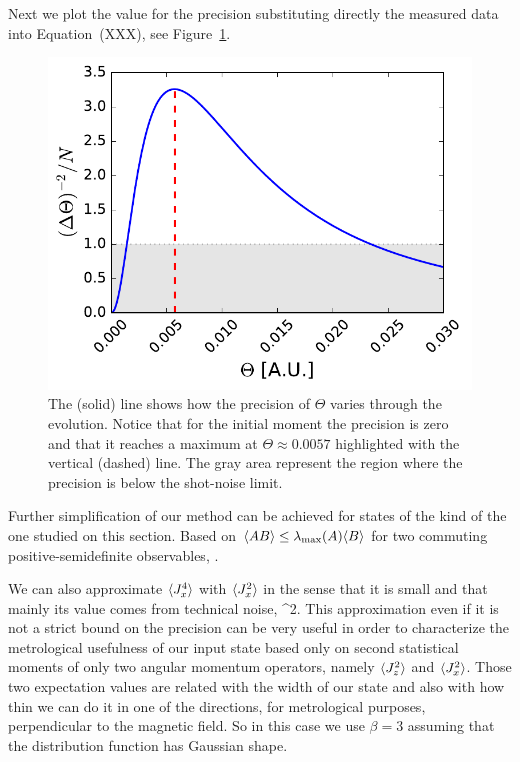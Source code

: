 {Next we plot the value for the precision substituting directly the measured data into Equation~{(XXX)}, see Figure~\ref{fig:vd-precision-theta}.
\begin{figure}
  \centering
  \includegraphics[scale=.65]{img/plots/VD_precision_theta.pdf}
  \caption{The (solid) line shows how the precision of $\Theta$ varies through the evolution. Notice that for the initial moment the precision is zero and that it reaches a maximum at $\Theta \approx 0.0057$ highlighted with the vertical (dashed) line. The gray area represent the region where the precision is below the shot-noise limit.}
  \label{fig:vd-precision-theta}
\end{figure}

Further simplification of our method can be achieved for states of the kind of the one studied on this section.
Based on $\langle AB \rangle\leq\lambda_{\max}(A)\langle B \rangle$ for two commuting positive-semidefinite observables,
\be
  \leq{}.
\ee

We can also approximate $\langle J_x^4 \rangle$ with $\langle J_x^2 \rangle$ in the sense that it is small and that mainly its value comes from technical noise,
\be
   \approx \beta {}^2.
\ee
This approximation even if it is not a strict bound on the precision can be very useful in order to characterize the metrological usefulness of our input state based only on second statistical moments of only two angular momentum operators, namely $\langle J_z^2 \rangle$ and $\langle J_x^2 \rangle$.
Those two expectation values are related with the width of our state and also with how thin we can do it in one of the directions, for metrological purposes, perpendicular to the magnetic field.
So in this case we use $\beta=3$ assuming that the distribution function has Gaussian shape.

}
